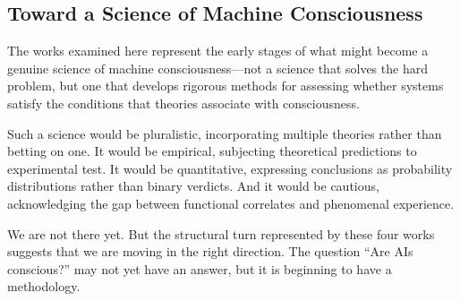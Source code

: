 \subsection{Toward a Science of Machine Consciousness}

The works examined here represent the early stages of what might become a genuine science of machine consciousness---not a science that solves the hard problem, but one that develops rigorous methods for assessing whether systems satisfy the conditions that theories associate with consciousness.

Such a science would be pluralistic, incorporating multiple theories rather than betting on one. It would be empirical, subjecting theoretical predictions to experimental test. It would be quantitative, expressing conclusions as probability distributions rather than binary verdicts. And it would be cautious, acknowledging the gap between functional correlates and phenomenal experience.

We are not there yet. But the structural turn represented by these four works suggests that we are moving in the right direction. The question ``Are AIs conscious?'' may not yet have an answer, but it is beginning to have a methodology.
